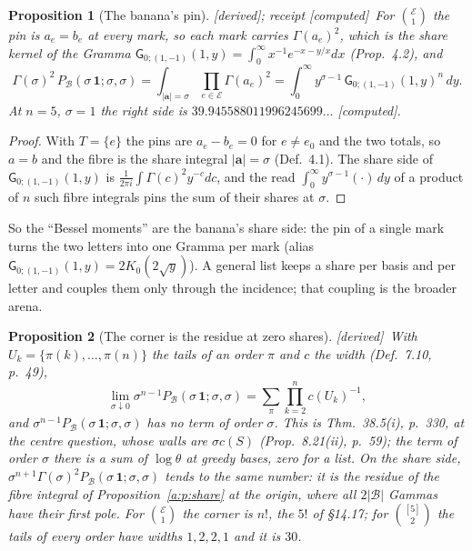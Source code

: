 \documentclass[11pt]{article}
\newcommand{\cE}{\mathcal E}
\newcommand{\cB}{\mathcal B}
\newcommand{\one}{\mathbf 1}
\newcommand{\sG}{\mathsf G}
\newcommand{\Pc}[1]{P_{\cB}(#1\,\one;#1,#1)}
\newcommand{\Cor}{\sum_\pi\prod_{k=2}^nc(U_k)^{-1}}
\theoremstyle{plain}
\newtheorem{proposition}{Proposition}[section]
\theoremstyle{definition}
\theoremstyle{remark}
\newcommand{\derived}{\textup{[derived]}}
\newcommand{\computed}{\textup{[computed]}}
\begin{document}
\begin{proposition}[The banana's pin]\label{a:p:bananapin}\derived; receipt \computed\
For $\binom{\cE}1$ the pin is $a_e=b_e$ at every mark, so each mark carries $\Gamma(a_e)^2$, which is the share kernel of the Gramma $\sG_{0;(1,-1)}(1,y)=\int_0^\infty x^{-1}e^{-x-y/x}dx$ (Prop.~4.2), and
\[
\Gamma(\sigma)^2\,\Pc\sigma=\int_{|\mathbf a|=\sigma}\prod_{e\in\cE}\Gamma(a_e)^2=\int_0^\infty y^{\sigma-1}\,\sG_{0;(1,-1)}(1,y)^n\,dy .
\]
At $n=5$, $\sigma=1$ the right side is $39.945588011996245699\ldots$ \computed.
\end{proposition}

\begin{proof}
With $T=\{e\}$ the pins are $a_e-b_e=0$ for $e\neq e_0$ and the two totals, so $a=b$ and the fibre is the share integral $|\mathbf a|=\sigma$ (Def.~4.1). The share side of $\sG_{0;(1,-1)}(1,y)$ is $\frac1{2\pi i}\int\Gamma(c)^2y^{-c}dc$, and the read $\int_0^\infty y^{\sigma-1}(\cdot)\,dy$ of a product of $n$ such fibre integrals pins the sum of their shares at $\sigma$.
\end{proof}

So the ``Bessel moments'' are the banana's share side: the pin of a single mark turns the two letters into one Gramma per mark (alias $\sG_{0;(1,-1)}(1,y)=2K_0(2\sqrt y)$). A general list keeps a share per basis and per letter and couples them only through the incidence; that coupling is the broader arena.

\begin{proposition}[The corner is the residue at zero shares]\label{a:p:corner}\derived\
With $U_k=\{\pi(k),\dots,\pi(n)\}$ the tails of an order $\pi$ and $c$ the width (Def.~7.10, p.~49),
\[
\lim_{\sigma\downarrow0}\sigma^{n-1}\Pc\sigma=\Cor ,
\]
and $\sigma^{n-1}\Pc\sigma$ has no term of order $\sigma$. This is Thm.~38.5(i), p.~330, at the centre question, whose walls are $\sigma c(S)$ (Prop.~8.21(ii), p.~59); the term of order $\sigma$ there is a sum of $\log\theta$ at greedy bases, zero for a list. On the share side, $\sigma^{n+1}\Gamma(\sigma)^2\Pc\sigma$ tends to the same number: it is the residue of the fibre integral of Proposition~\ref{a:p:share} at the origin, where all $2|\cB|$ Gammas have their first pole. For $\binom{\cE}1$ the corner is $n!$, the $5!$ of \S14.17; for $\binom{[5]}2$ the tails of every order have widths $1,2,2,1$ and it is $30$.
\end{proposition}
\end{document}
